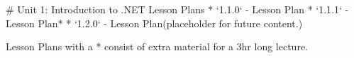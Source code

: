 # Unit 1: Introduction to .NET
Lesson Plans
* `1.1.0` - Lesson Plan
* `1.1.1` - Lesson Plan*
* `1.2.0` - Lesson Plan(placeholder for future content.)

Lesson Plans with a * consist of extra material for a 3hr long lecture.



